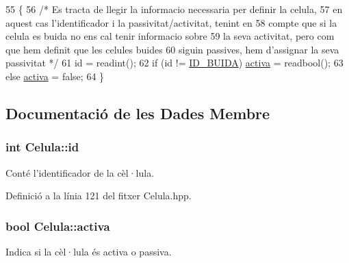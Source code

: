 \begin{DoxyCode}
55                            \{
56     \textcolor{comment}{/* Es tracta de llegir la informacio necessaria per definir la celula,
}
57 \textcolor{comment}{       en aquest cas l'identificador i la passivitat/activitat, tenint en
}
58 \textcolor{comment}{       compte que si la celula es buida no ens cal tenir informacio sobre
}
59 \textcolor{comment}{       la seva activitat, pero com que hem definit que les celules buides
}
60 \textcolor{comment}{       siguin passives, hem d'assignar la seva passivitat */}
61     \textcolor{keywordtype}{id} = readint();
62     \textcolor{keywordflow}{if} (\textcolor{keywordtype}{id} != \hyperlink{class_celula_a22f5121a6d3cc3cee44274b55ec842e9}{ID\_BUIDA}) \hyperlink{class_celula_a22ec0fe5fde605b5b3067acde093a3f7}{activa} = readbool();
63     \textcolor{keywordflow}{else} \hyperlink{class_celula_a22ec0fe5fde605b5b3067acde093a3f7}{activa} = \textcolor{keyword}{false};
64 \}
\end{DoxyCode}


\subsection{Documentació de les Dades Membre}
\hypertarget{class_celula_a0984a8b3deeed4979ed6f6141edc3c0c}{
\subsubsection[{id}]{\setlength{\rightskip}{0pt plus 5cm}int Celula\-::id\hspace{0.3cm}{\ttfamily [private]}}}\label{class_celula_a0984a8b3deeed4979ed6f6141edc3c0c}


Conté l'identificador de la cèl·lula. 



Definició a la línia 121 del fitxer Celula.\-hpp.

\hypertarget{class_celula_a22ec0fe5fde605b5b3067acde093a3f7}{
\subsubsection[{activa}]{\setlength{\rightskip}{0pt plus 5cm}bool Celula\-::activa\hspace{0.3cm}{\ttfamily [private]}}}\label{class_celula_a22ec0fe5fde605b5b3067acde093a3f7}


Indica si la cèl·lula és activa o passiva. 



